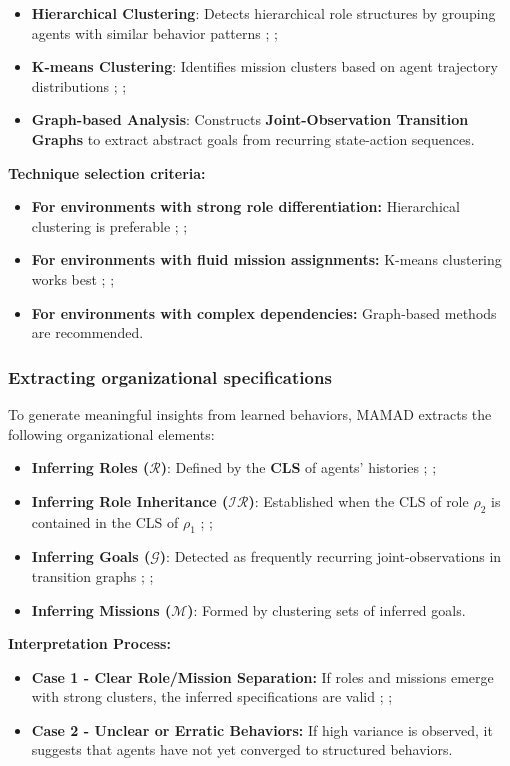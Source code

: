 \documentclass[pdflatex,sn-mathphys-num]{sn-jnl}%
\theoremstyle{thmstyleone}%
\theoremstyle{thmstyletwo}%
\theoremstyle{thmstylethree}%
\begin{document}
\begin{itemize}
    \item \textbf{Hierarchical Clustering}: Detects hierarchical role structures by grouping agents with similar behavior patterns ; ;
    \item \textbf{K-means Clustering}: Identifies mission clusters based on agent trajectory distributions ; ;
    \item \textbf{Graph-based Analysis}: Constructs \textbf{Joint-Observation Transition Graphs} to extract abstract goals from recurring state-action sequences.
\end{itemize}

\noindent \textbf{Technique selection criteria:}
\begin{itemize}
    \item \textbf{For environments with strong role differentiation:} Hierarchical clustering is preferable ; ;
    \item \textbf{For environments with fluid mission assignments:} K-means clustering works best ; ;
    \item \textbf{For environments with complex dependencies:} Graph-based methods are recommended.
\end{itemize}

\subsubsection{Extracting organizational specifications}
To generate meaningful insights from learned behaviors, MAMAD extracts the following organizational elements:

\begin{itemize}
    \item \textbf{Inferring Roles ($\mathcal{R}$)}: Defined by the \textbf{CLS} of agents' histories ; ;
    \item \textbf{Inferring Role Inheritance ($\mathcal{IR}$)}: Established when the CLS of role $\rho_2$ is contained in the CLS of $\rho_1$ ; ;
    \item \textbf{Inferring Goals ($\mathcal{G}$)}: Detected as frequently recurring joint-observations in transition graphs ; ;
    \item \textbf{Inferring Missions ($\mathcal{M}$)}: Formed by clustering sets of inferred goals.
\end{itemize}

\noindent \textbf{Interpretation Process:}
\begin{itemize}
    \item \textbf{Case 1 - Clear Role/Mission Separation:} If roles and missions emerge with strong clusters, the inferred specifications are valid ; ;
    \item \textbf{Case 2 - Unclear or Erratic Behaviors:} If high variance is observed, it suggests that agents have not yet converged to structured behaviors.
\end{itemize}
\end{document}
